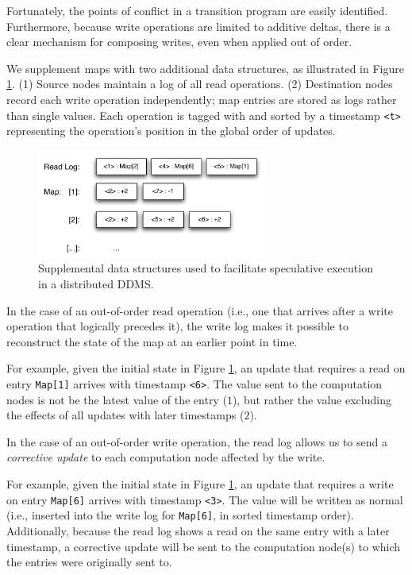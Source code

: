 Fortunately, the points of conflict in a transition program are easily identified.  Furthermore, because write operations are limited to additive deltas, there is a clear mechanism for composing writes, even when applied out of order.

We supplement maps with two additional data structures, as illustrated in Figure \ref{fig:speculativeStorage}.  (1) Source nodes maintain a log of all read operations.  (2) Destination nodes record each write operation independently; map entries are stored as logs rather than single values.  Each operation is tagged with and sorted by a timestamp \texttt{<t>} representing the operation's position in the global order of updates.

\begin{figure}
\begin{center}
\includegraphics[width=3.0in]{graphics/speculative_storage}
\end{center}
\caption{Supplemental data structures used to facilitate speculative execution in a distributed DDMS.}
\label{fig:speculativeStorage}
\end{figure}

In the case of an out-of-order read operation (i.e., one that arrives after a write operation that logically precedes it), the write log makes it possible to reconstruct the state of the map at an earlier point in time.  

For example, given the initial state in Figure \ref{fig:speculativeStorage}, an update that requires a read on entry \texttt{Map[1]} arrives with timestamp \texttt{<6>}.  The value sent to the computation nodes is not be the latest value of the entry ($1$), but rather the value excluding the effects of all updates with later timestamps ($2$).

In the case of an out-of-order write operation, the read log allows us to send a \textit{corrective update} to each computation node affected by the write.  

For example, given the initial state in Figure \ref{fig:speculativeStorage}, an update that requires a write on entry \texttt{Map[6]} arrives with timestamp \texttt{<3>}.  The value will be written as normal (i.e., inserted into the write log for \texttt{Map[6]}, in sorted timestamp order).  Additionally, because the read log shows a read on the same entry with a later timestamp, a corrective update will be sent to the computation node(s) to which the entries were originally sent to.

